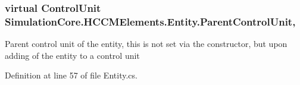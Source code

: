 \subsubsection[{\texorpdfstring{Parent\+Control\+Unit}{ParentControlUnit}}]{\setlength{\rightskip}{0pt plus 5cm}virtual {\bf Control\+Unit} Simulation\+Core.\+H\+C\+C\+M\+Elements.\+Entity.\+Parent\+Control\+Unit\hspace{0.3cm}{\ttfamily [get]}, {\ttfamily [set]}}\hypertarget{class_simulation_core_1_1_h_c_c_m_elements_1_1_entity_acf748ea5c593457572db419a6680e957}{}\label{class_simulation_core_1_1_h_c_c_m_elements_1_1_entity_acf748ea5c593457572db419a6680e957}


Parent control unit of the entity, this is not set via the constructor, but upon adding of the entity to a control unit 



Definition at line 57 of file Entity.\+cs.

